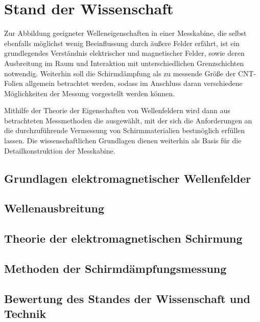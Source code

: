

\chapter{Stand der Wissenschaft}\label{cha:2}

Zur Abbildung geeigneter Welleneigenschaften in einer Messkabine, die selbst ebenfalls möglichst wenig Beeinflussung durch äußere Felder erfährt, ist ein grundlegendes Verständnis elektrischer und magnetischer Felder, sowie deren Ausbreitung im Raum und Interaktion mit unterschiedlichen Grenzschichten notwendig. Weiterhin soll die Schirmdämpfung als zu messende Größe der CNT-Folien allgemein betrachtet werden, sodass im Anschluss daran verschiedene Möglichkeiten der Messung vorgestellt werden können. \par
\vspace{\linespace}
Mithilfe der Theorie der Eigenschaften von Wellenfeldern wird dann aus betrachteten Messmethoden die ausgewählt, mit der sich die Anforderungen an die durchzuführende Vermessung von Schirm\-materialien bestmöglich erfüllen lassen. Die wissenschaftlichen Grundlagen dienen weiterhin als Basis für die Detailkonstruktion der Messkabine.


\section{Grundlagen elektromagnetischer Wellenfelder}\label{cha:2_Grundlagen}




\section{Wellenausbreitung}\label{cha:2_Wellenausbreitung}




\section{Theorie der elektromagnetischen Schirmung}\label{cha:2_Theorie_der_elektromagnetischen_Schirmung}





\section{Methoden der Schirmdämpfungsmessung}\label{cha:2_Methoden_der_Schirmdaempfungsmessung}




\section{Bewertung des Standes der Wissenschaft und Technik}\label{cha:2_Bewertung_Stand_der_Technik}

